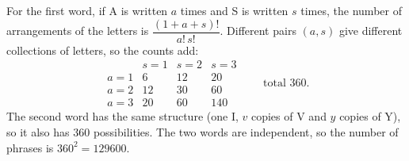For the first word, if A is written $a$ times and S is written $s$ times, the number of arrangements of the letters is $\dfrac{(1+a+s)!}{a!\,s!}$. Different pairs $(a,s)$ give different collections of letters, so the counts add:
\[\begin{array}{c|ccc} & s=1 & s=2 & s=3\\ \hline a=1 & 6 & 12 & 20\\ a=2 & 12 & 30 & 60\\ a=3 & 20 & 60 & 140\end{array}\qquad\text{total }360.\]
The second word has the same structure (one I, $v$ copies of V and $y$ copies of Y), so it also has $360$ possibilities. The two words are independent, so the number of phrases is $360^2=\boxed{129600}$.
